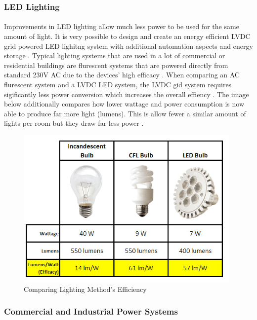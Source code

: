 \subsubsection{LED Lighting}

\paragraph{}
Improvements in LED lighting allow much less power to be used for the same amount of light. It is very possible to design and create an energy efficient LVDC grid powered LED lighitng system with additional automation aspects and energy storage \cite{Koh2011}. Typical lighting systems that are used in a lot of commercial or residential buildings are flurescent systems that are powered directly from standard 230V AC due to the devices' high efficacy \cite{Koh2011}. When comparing an AC flurescent system and a LVDC LED system, the LVDC gid system requires sigificantly less power conversion which increases the overall effiency \cite{Koh2011}. The image below additionally compares how lower wattage and power consumption is now able to produce far more light (lumens). This is allow fewer a similar amount of lights per room but they draw far less power \cite{website:LED}.  

\begin{figure}[H]
\hfill\includegraphics[width = 110mm]{images/LED_Comparison}\hspace*{\fill}
\caption{Comparing Lighting Method's Efficiency \cite{website:LED}}
\label{fig:LightingEfficiency}
\end{figure}
\newpage

\subsubsection{Commercial and Industrial Power Systems}

